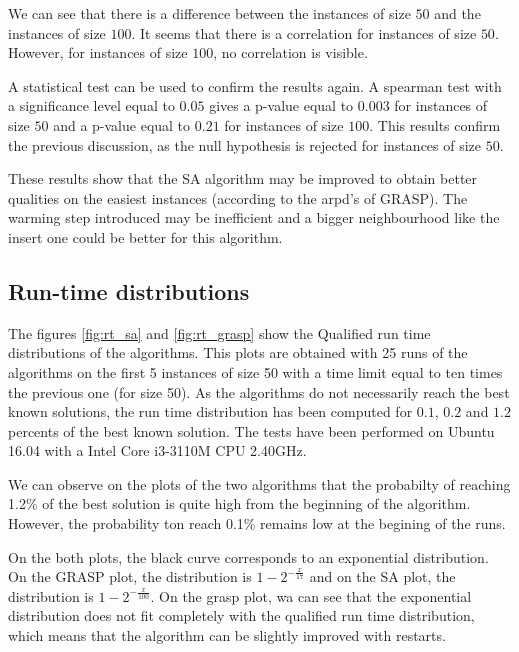 \documentclass{article}
\begin{document}
We can see that there is a difference between the instances of size $50$ and the instances of size $100$.
It seems that there is a correlation for instances of size $50$.
However, for instances of size $100$, no correlation is visible.\newline

A statistical test can be used to confirm the results again.
A spearman test with a significance level equal to $0.05$ gives a p-value equal to $0.003$ for instances of size $50$ and a p-value equal to 0$.21$ for instances of size $100$.
This results confirm the previous discussion, as the null hypothesis is rejected for instances of size $50$.\newline

These results show that the SA algorithm may be improved to obtain better qualities on the easiest instances (according to the arpd's of GRASP).
The warming step introduced may be inefficient and a bigger neighbourhood like the insert one could be better for this algorithm.

\subsection{Run-time distributions}

The figures \ref{fig:rt_sa} and \ref{fig:rt_grasp} show the Qualified run time distributions of the algorithms.
This plots are obtained with 25 runs of the algorithms on the first 5 instances of size 50 with a time limit equal to ten times the previous one (for size 50).
As the algorithms do not necessarily reach the best known solutions, the run time distribution has been computed for $0.1$, $0.2$ and $1.2$ percents of the best known solution.
The tests have been performed on Ubuntu 16.04 with a Intel Core i3-3110M CPU 2.40GHz. \newline

We can observe on the plots of the two algorithms that the probabilty of reaching 1.2\% of the best solution is quite high from the beginning of the algorithm.
However, the probability ton reach 0.1\% remains low at the begining of the runs.

On the both plots, the black curve corresponds to an exponential distribution.
On the GRASP plot, the distribution is $1-2^{-\frac{x}{17}}$ and on the SA plot, the distribution is $1-2^{-\frac{x}{100}}$.
On the grasp plot, wa can see that the exponential distribution does not fit completely with the qualified run time distribution, which means that the algorithm can be slightly improved with restarts.\newline
\end{document}
